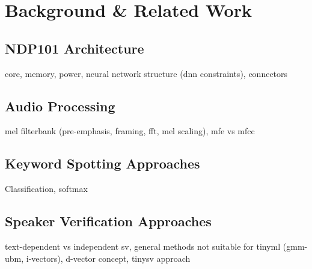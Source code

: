 \chapter{Background \& Related Work}
\label{cha:background}

\section{NDP101 Architecture}
\label{sec:architecture}
core, memory, power, neural network structure (dnn constraints), connectors\newline

\section{Audio Processing}
\label{sec:audio}
mel filterbank (pre-emphasis, framing, fft, mel scaling), mfe vs mfcc\newline

\section{Keyword Spotting Approaches}
\label{sec:kws approaches}
Classification, softmax

\section{Speaker Verification Approaches}
\label{sec:sv approaches}
text-dependent vs independent sv, general methods not suitable for tinyml (gmm-ubm, i-vectors), d-vector concept, tinysv approach \newline

\newpage